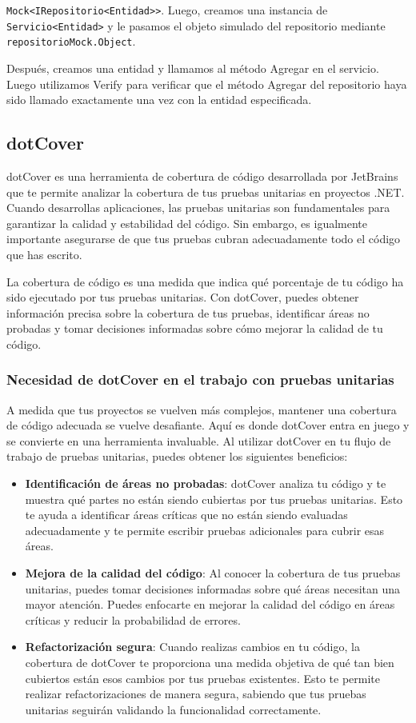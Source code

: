\documentclass[executivepaper]{article}
\begin{document}
\lstinline{Mock<IRepositorio<Entidad>>}. Luego, creamos una instancia de \lstinline{Servicio<Entidad>} y le pasamos el objeto simulado del repositorio mediante \lstinline{repositorioMock.Object}.

Después, creamos una entidad y llamamos al método Agregar en el servicio. Luego utilizamos Verify para verificar que el método Agregar del repositorio haya sido llamado exactamente una vez con la entidad especificada.

\subsection{dotCover}

dotCover es una herramienta de cobertura de código desarrollada por JetBrains que te permite analizar la cobertura de tus pruebas unitarias en proyectos .NET. Cuando desarrollas aplicaciones, las pruebas unitarias son fundamentales para garantizar la calidad y estabilidad del código. Sin embargo, es igualmente importante asegurarse de que tus pruebas cubran adecuadamente todo el código que has escrito.

La cobertura de código es una medida que indica qué porcentaje de tu código ha sido ejecutado por tus pruebas unitarias. Con dotCover, puedes obtener información precisa sobre la cobertura de tus pruebas, identificar áreas no probadas y tomar decisiones informadas sobre cómo mejorar la calidad de tu código.

\subsubsection*{Necesidad de dotCover en el trabajo con pruebas unitarias}

A medida que tus proyectos se vuelven más complejos, mantener una cobertura de código adecuada se vuelve desafiante. Aquí es donde dotCover entra en juego y se convierte en una herramienta invaluable. Al utilizar dotCover en tu flujo de trabajo de pruebas unitarias, puedes obtener los siguientes beneficios:

\begin{itemize}
  \item \textbf{Identificación de áreas no probadas}: dotCover analiza tu código y te muestra qué partes no están siendo cubiertas por tus pruebas unitarias. Esto te ayuda a identificar áreas críticas que no están siendo evaluadas adecuadamente y te permite escribir pruebas adicionales para cubrir esas áreas.
  \item \textbf{Mejora de la calidad del código}: Al conocer la cobertura de tus pruebas unitarias, puedes tomar decisiones informadas sobre qué áreas necesitan una mayor atención. Puedes enfocarte en mejorar la calidad del código en áreas críticas y reducir la probabilidad de errores.
  \item \textbf{Refactorización segura}: Cuando realizas cambios en tu código, la cobertura de dotCover te proporciona una medida objetiva de qué tan bien cubiertos están esos cambios por tus pruebas existentes. Esto te permite realizar refactorizaciones de manera segura, sabiendo que tus pruebas unitarias seguirán validando la funcionalidad correctamente.
\end{itemize}
\end{document}
